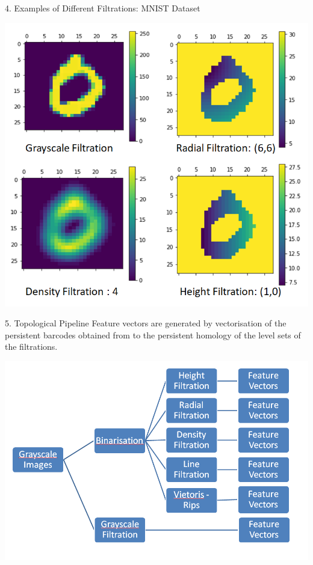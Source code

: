 \documentclass{beamer}
\begin{document}
\begin{frame}{4. Examples of Different Filtrations: MNIST Dataset}
\begin{center}
\includegraphics[width=\linewidth,height=0.9\textheight,keepaspectratio]{img1}
\end{center}
\end{frame}

\begin{frame}{5. Topological Pipeline}
Feature vectors are generated by vectorisation of the persistent barcodes obtained from to the persistent homology of the level sets of the filtrations.
\begin{center}
\includegraphics[width=\linewidth,height=0.55\textheight,keepaspectratio]{img2}
\end{center}
\end{frame}
\end{document}
